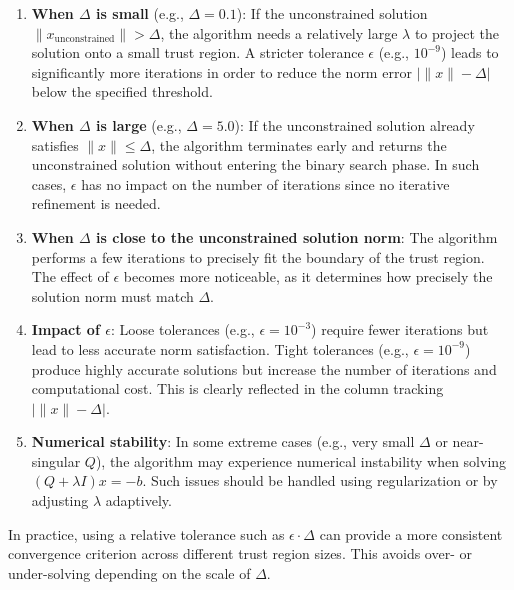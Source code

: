 \documentclass[12pt]{article}
\begin{document}
\begin{enumerate}
    \item \textbf{When $\Delta$ is small} (e.g., $\Delta = 0.1$): If the unconstrained solution $\|x_{\text{unconstrained}}\| > \Delta$, the algorithm needs a relatively large $\lambda$ to project the solution onto a small trust region. A stricter tolerance $\epsilon$ (e.g., $10^{-9}$) leads to significantly more iterations in order to reduce the norm error $|\|x\| - \Delta|$ below the specified threshold.

    \item \textbf{When $\Delta$ is large} (e.g., $\Delta = 5.0$): If the unconstrained solution already satisfies $\|x\| \le \Delta$, the algorithm terminates early and returns the unconstrained solution without entering the binary search phase. In such cases, $\epsilon$ has no impact on the number of iterations since no iterative refinement is needed.

    \item \textbf{When $\Delta$ is close to the unconstrained solution norm}: The algorithm performs a few iterations to precisely fit the boundary of the trust region. The effect of $\epsilon$ becomes more noticeable, as it determines how precisely the solution norm must match $\Delta$.

    \item \textbf{Impact of $\epsilon$}: Loose tolerances (e.g., $\epsilon = 10^{-3}$) require fewer iterations but lead to less accurate norm satisfaction. Tight tolerances (e.g., $\epsilon = 10^{-9}$) produce highly accurate solutions but increase the number of iterations and computational cost. This is clearly reflected in the column tracking $|\|x\| - \Delta|$.

    \item \textbf{Numerical stability}: In some extreme cases (e.g., very small $\Delta$ or near-singular $Q$), the algorithm may experience numerical instability when solving $(Q + \lambda I)x = -b$. Such issues should be handled using regularization or by adjusting $\lambda$ adaptively. 
\end{enumerate}
In practice, using a relative tolerance such as $\epsilon \cdot \Delta$ can provide a more consistent convergence criterion across different trust region sizes. This avoids over- or under-solving depending on the scale of $\Delta$.
\end{document}

